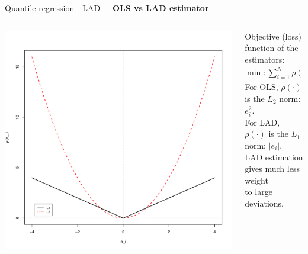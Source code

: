 \documentclass{beamer}
\begin{document}
\begin{frame}{Quantile regression - LAD}
\textbf{~~OLS vs LAD estimator}
\begin{columns}
        \begin{column}{.5\textwidth}
            \includegraphics[width=1\textwidth]{img/B1_L1_L2.pdf}
        \end{column}
        \begin{column}{.5\textwidth}
        \tiny
            Objective (loss) function of the estimators:\\ \medskip
            $\min : \displaystyle\sum_{i=1}^N \rho(e_i) = \sum_{i=1}^N \rho(y_i - \bm{x}_i^{\prime} \hat{\bm{\beta}})$\\
            \medskip
            For OLS, $\rho(\cdot)$ is the $L_2$ norm:  $e_i^2$. \\ \smallskip For LAD, $\rho(\cdot)$ is the $L_1$ norm: $|e_i|$. \\ \medskip
            LAD estimation gives much less weight \\to large deviations.
            
        \end{column}
    \end{columns}
\end{frame}
\end{document}
